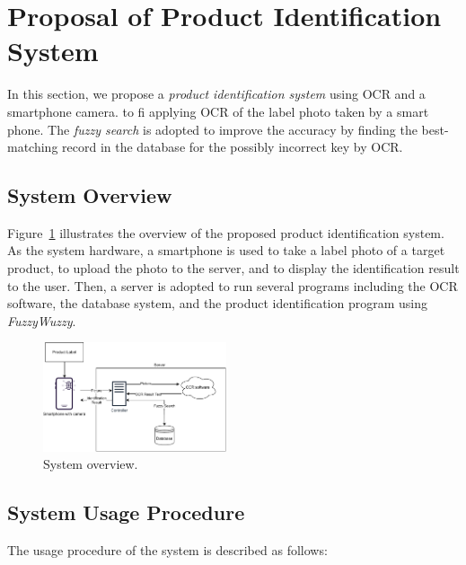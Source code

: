 \documentclass[technicalreport]{ieicej}
\begin{document}
\section{Proposal of Product Identification System}
\label{sec:proposal}
    In this section, we propose a {\em product identification system} using OCR and a smartphone camera.
    to fi applying OCR of the label photo taken by a smart phone. The {\em fuzzy search} is adopted to improve the accuracy by finding the best-matching record in the database for the possibly incorrect key by OCR. 

    \subsection{System Overview}
        Figure~\ref{fig:system} illustrates the overview of the proposed product identification system. As the system hardware, a smartphone is used to take a label photo of a target product, to upload the photo to the server, and to display the identification result to the user. Then, a server is adopted to run several programs including the OCR software, the database system, and the product identification program using {\em FuzzyWuzzy}. 

        \begin{figure}[t] 
            \begin{center}
            \includegraphics[width=0.48\textwidth]{figure/system.pdf}
            \end{center}
            \caption{System overview.}
            \label{fig:system}
        \end{figure}

    \subsection{System Usage Procedure}
        The usage procedure of the system is described as follows:
\end{document}
